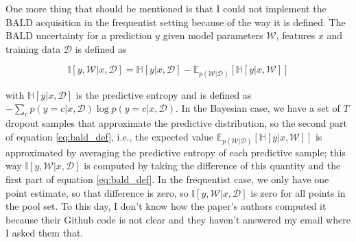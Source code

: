 %
%
%
%

One more thing that should be mentioned is that I could not implement the BALD acquisition in the frequentist setting because of the way it is defined. The BALD uncertainty for a prediction $y$ given model parameters $\mathcal{W}$, features $x$ and training data $\mathcal{D}$ is defined as

\begin{equation}
	\label{eq:bald_def}
	\mathbb{I}[y, \mathcal{W} | x, \mathcal{D}] = \mathbb{H}[y | x, \mathcal{D}] - \mathbb{E}_{p(\mathcal{W} | \mathcal{D})}[\mathbb{H}[y | x, \mathcal{W}]]
\end{equation}

with $\mathbb{H}[y | x, \mathcal{D}]$ is the predictive entropy and is defined as $-\sum_c p(y = c | x, \mathcal{D}) \log p(y = c | x, \mathcal{D})$. In the Bayesian case, we have a set of $T$ dropout samples that approximate the predictive distribution, so the second part of equation \ref{eq:bald_def}, i.e., the expected value $\mathbb{E}_{p(\mathcal{W} | \mathcal{D})}[\mathbb{H}[y | x, \mathcal{W}]]$ is approximated by averaging the predictive entropy of each predictive sample; this way $\mathbb{I}[y, \mathcal{W} | x, \mathcal{D}]$ is computed by taking the difference of this quantity and the first part of equation \ref{eq:bald_def}. In the frequentist case, we only have one point estimate, so that difference is zero, so $\mathbb{I}[y, \mathcal{W} | x, \mathcal{D}]$ is zero for all points in the pool set. To this day, I don't know how the paper's authors computed it because their Github code is not clear and they haven't answered my email where I asked them that.
